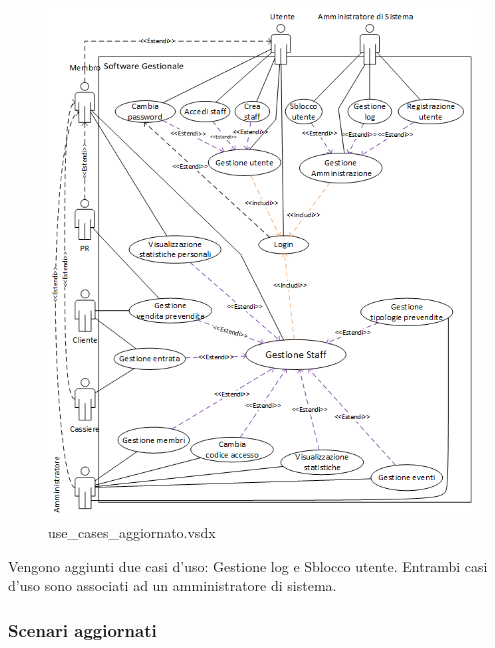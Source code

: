 \documentclass[a4paper]{article}
\begin{document}
\begin{figure}[H]
    \includegraphics[scale=1]{Analisi/Cases/use_cases_aggiornato.png}
    \centering
    \caption{use\_cases\_aggiornato.vsdx}
\end{figure}

Vengono aggiunti due casi d'uso: Gestione log e Sblocco utente. Entrambi casi d'uso sono associati ad un amministratore di sistema.

\newpage

\subsubsection{Scenari aggiornati}

\end{document}
